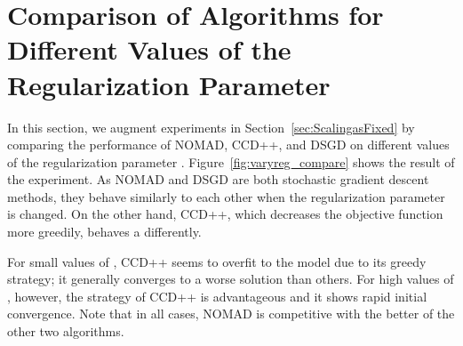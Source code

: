 \documentclass{vldb}
\begin{document}
\section{Comparison of Algorithms for Different Values of
    the Regularization Parameter}

  In this section, we augment experiments in
  Section~\ref{sec:ScalingasFixed} by comparing the performance of
  NOMAD, CCD++, and DSGD on different values of the regularization
  parameter .  Figure~\ref{fig:varyreg_compare} shows the
  result of the experiment.  As NOMAD and DSGD are both stochastic
  gradient descent methods, they behave similarly to each other when
  the regularization parameter is changed.  On the other hand, CCD++,
  which decreases the objective function more greedily, behaves a
  differently.

  For small values of , CCD++ seems to overfit to the model
  due to its greedy strategy; it generally converges to a worse
  solution than others.  For high values of , however, the
  strategy of CCD++ is advantageous and it shows rapid initial
  convergence.  Note that in all cases, NOMAD is competitive with the
  better of the other two algorithms.
\end{document}
